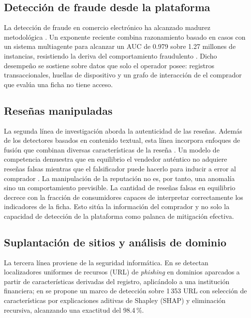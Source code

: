 \subsection{Detección de fraude desde la plataforma}

La detección de fraude en comercio electrónico ha alcanzado madurez metodológica \cite{ref10}.
Un exponente reciente combina razonamiento basado en casos con un sistema multiagente para
alcanzar un AUC de 0.979 sobre 1.27 millones de instancias, resistiendo la deriva del
comportamiento fraudulento \cite{ref28}. Dicho desempeño se sostiene sobre datos que solo el
operador posee: registros transaccionales, huellas de dispositivo y un grafo de interacción de
el comprador que evalúa una ficha no tiene acceso.

\subsection{Reseñas manipuladas}

La segunda línea de investigación aborda la autenticidad de las reseñas. Además de los
detectores basados en contenido textual, esta línea incorpora enfoques de fusión que combinan
diversas características de la reseña \cite{ref15}. Un modelo de competencia demuestra que en
equilibrio el vendedor auténtico no adquiere reseñas falsas mientras que el falsificador puede
hacerlo para inducir a error al comprador \cite{ref29}. La manipulación de la reputación no es,
por tanto, una anomalía sino un comportamiento previsible. La cantidad de reseñas falsas en
equilibrio decrece con la fracción de consumidores capaces de interpretar correctamente los
indicadores de la ficha. Esto sitúa la información del comprador y no
solo la capacidad de detección de la plataforma como palanca de mitigación efectiva.

\subsection{Suplantación de sitios y análisis de dominio}

La tercera línea proviene de la seguridad informática. En \cite{ref7} se detectan localizadores
uniformes de recursos (URL) de \textit{phishing} en dominios aparcados a partir de
características derivadas del registro, aplicándolo a una institución financiera; en
\cite{ref25} se propone un marco de detección sobre 1\,353 URL con selección de
características por explicaciones aditivas de Shapley (SHAP) y eliminación recursiva, alcanzando
una exactitud del 98.4\,\%.

